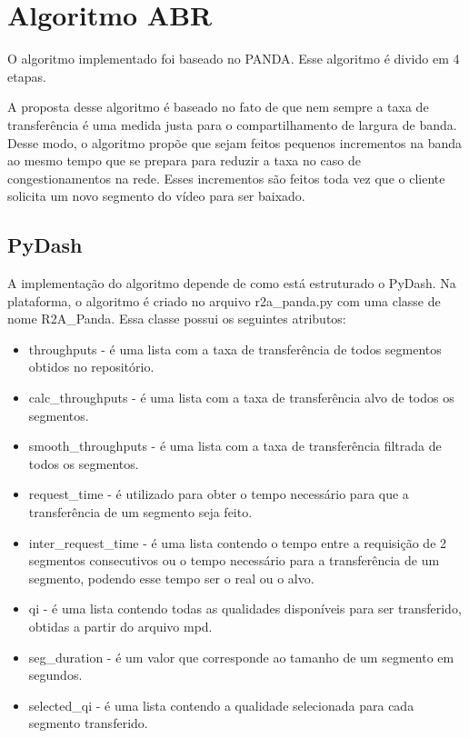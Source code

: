 \documentclass[10pt,twocolumn,letterpaper]{article}
\begin{document}
	
	
	\section{Algoritmo ABR}
	O algoritmo implementado foi baseado no PANDA\cite{panda}. Esse algoritmo é divido em 4 etapas.
	
	A proposta desse algoritmo é baseado no fato de que nem sempre a taxa de transferência é uma medida justa para o compartilhamento de largura de banda. Desse modo, o algoritmo propõe que sejam feitos pequenos incrementos na banda ao mesmo tempo que se prepara para reduzir a taxa no caso de congestionamentos na rede. Esses incrementos são feitos toda vez que o cliente solicita um novo segmento do vídeo para ser baixado.
	
	\subsection{PyDash}
	A implementação do algoritmo depende de como está estruturado o PyDash. Na plataforma, o algoritmo é criado no arquivo r2a\_panda.py com uma classe de nome R2A\_Panda. Essa classe possui os seguintes atributos:
	
	\begin{itemize}
		\item throughputs - é uma lista com a taxa de transferência de todos segmentos obtidos no repositório.
		\item calc\_throughputs - é uma lista com a taxa de transferência alvo de todos os segmentos.
		\item smooth\_throughputs - é uma lista com a taxa de transferência filtrada de todos os segmentos.
		\item request\_time - é utilizado para obter o tempo necessário para que a transferência de um segmento seja feito.
		\item inter\_request\_time - é uma lista contendo o tempo entre a requisição de 2 segmentos consecutivos ou o tempo necessário para a transferência de um segmento, podendo esse tempo ser o real ou o alvo.
		\item qi - é uma lista contendo todas as qualidades disponíveis para ser transferido, obtidas a partir do arquivo mpd.
		\item seg\_duration - é um valor que corresponde ao tamanho de um segmento em segundos.
		\item selected\_qi - é uma lista contendo a qualidade selecionada para cada segmento transferido.
	\end{itemize}
	
\end{document}

